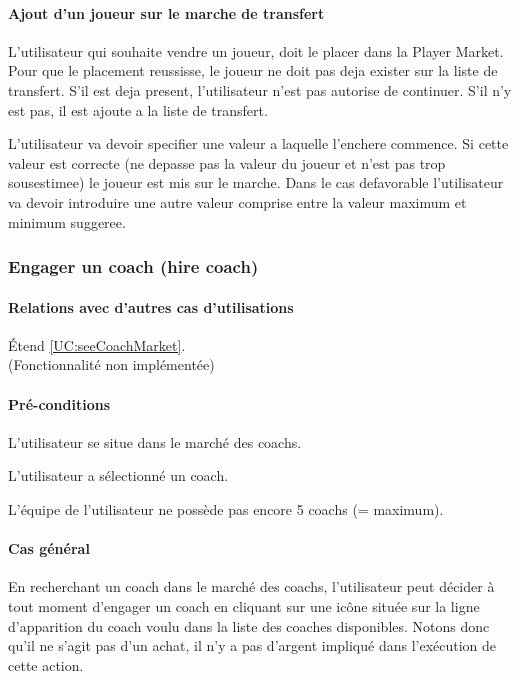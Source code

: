 \paragraph{Ajout d'un joueur sur le marche de transfert}
\begin{list}{}{\leftmargin=1.5em}
\item{L'utilisateur qui souhaite vendre un joueur, doit le placer dans la Player Market. Pour que le placement reussisse, le joueur ne doit pas deja exister sur la liste de transfert. S'il est deja present, l'utilisateur n'est pas autorise de continuer. S'il n'y est pas, il est ajoute a la liste de transfert.}
\item{L'utilisateur va devoir specifier une valeur a laquelle l'enchere commence. Si cette valeur est correcte (ne depasse pas la valeur du joueur et n'est pas trop sousestimee) le joueur est mis sur le marche. Dans le cas defavorable l'utilisateur va devoir introduire une autre valeur comprise entre la valeur maximum et minimum suggeree.}
\end{list}


\subsubsection{Engager un coach (hire coach)}
\label{UC:hireCoach}
\paragraph{Relations avec d'autres cas d'utilisations}
Étend \ref{UC:seeCoachMarket}.
\\(Fonctionnalité non implémentée)
\paragraph{Pré-conditions}
\begin{list}{}{\leftmargin=1.5em}
\item{L'utilisateur se situe dans le marché des coachs.}
\item{L'utilisateur a sélectionné un coach.}
\item{L'équipe de l'utilisateur ne possède pas encore 5 coachs (= maximum).}
\end{list}
\paragraph{Cas général}
En recherchant un coach dans le marché des coachs, l'utilisateur peut décider à tout moment d'engager un coach en cliquant sur une icône située sur la ligne d'apparition du coach voulu dans la liste des coaches disponibles. Notons donc qu'il ne s'agit pas d'un achat, il n'y a pas d'argent impliqué dans l'exécution de cette action. 
